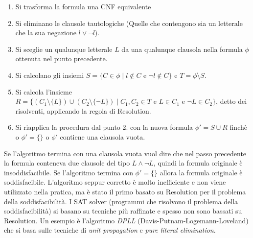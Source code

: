 \documentclass[./main.tex]{subfiles}
\begin{document}
\begin{enumerate}
  \item Si trasforma la formula una CNF equivalente
  \item Si eliminano le clausole tautologiche
  (Quelle che contengono sia un letterale che la sua negazione $l \lor \lnot l$).
  \item Si sceglie un qualunque letterale $L$ da una qualunque clausola nella formula $\phi$ ottenuta nel punto precedente.
  \item Si calcolano gli insiemi $S = \{C \in \phi \mid l \notin C \text{ e } \lnot l \notin C\}$ e $T = \phi \setminus S$.
  \item Si calcola l'insieme 
  $R = \{(C_1 \setminus \{L\}) \cup (C_2 \setminus \{\lnot L\}) \mid C_1, C_2 \in T \text{ e } L \in C_1 \text{ e } \lnot L \in C_2\}$, 
  detto dei risolventi, applicando la regola di Resolution.
  \item Si riapplica la procedura dal punto 2. con la nuova formula $\phi' = S \cup R$ finchè o $\phi' = \{\}$
  o $\phi'$ contiene una clausola vuota.
\end{enumerate}

Se l'algoritmo termina con una clausola vuota vuol dire che nel passo precedente la formula conteneva due clausole del tipo $L \land \lnot L$,
quindi la formula originale è insoddisfacibile. Se l'algoritmo termina con $\phi' = \{\}$ allora la formula originale è soddisfacibile.
L'algoritmo seppur corretto è molto inefficiente e non viene utilizzato nella pratica, 
ma è stato il primo basato su Resolution per il problema della soddisfacibilità. 
I SAT solver (programmi che risolvono il problema della soddisfacibilità) si basano su tecniche più raffinate e spesso non sono bassati su Resolution.
Un esempio è l'algoritmo \textit{DPLL} (Davis-Putnam-Logemann-Loveland) che si basa sulle tecniche di \textit{unit propagation} e \textit{pure literal elimination}.
\end{document}
